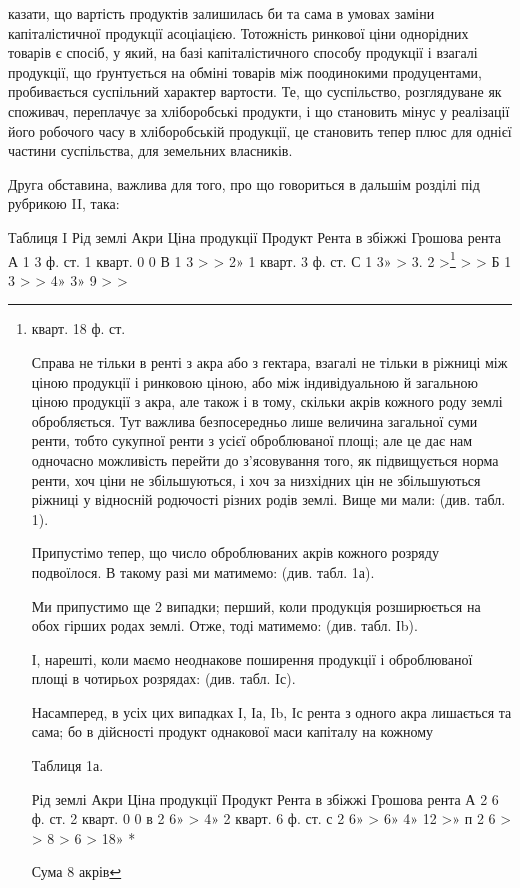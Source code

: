 \parcont{}  %
казати, що вартість продуктів залишилась би та сама в умовах заміни капіталістичної
продукції асоціацією. Тотожність ринкової ціни однорідних товарів є
спосіб, у який, на базі капіталістичного способу продукції і взагалі продукції,
що ґрунтується на обміні товарів між поодинокими продуцентами, пробивається
суспільний характер вартости. Те, що суспільство, розглядуване як споживач,
переплачує за хліборобські продукти, і що становить мінус у реалізації його
робочого часу в хліборобській продукції, це становить тепер плюс для однієї
частини суспільства, для земельних власників.

Друга обставина, важлива для того, про що говориться в дальшім розділі
під рубрикою II, така:

Таблиця I
Рід  землі    Акри    Ціна  продукції    Продукт    Рента в збіжжі    Грошова  рента
А    1    3 ф. ст.    1 кварт.    0    0
В    1    3 > >    2» 1 кварт.    3 ф. ст.
С 1 3» > 3. 2 >\footnote{
кварт. 18 ф. ст.

Справа не тільки в ренті з акра або з гектара, взагалі не тільки в ріжниці
між ціною продукції і ринковою ціною, або між індивідуальною й загальною
ціною продукції з
акра, але також і в тому,
скільки акрів кожного
роду землі обробляється.
Тут важлива безпосередньо
лише величина загальної
суми ренти, тобто сукупної
ренти з усієї оброблюваної
площі; але це дає
нам одночасно можливість
перейти до з’ясовування
того, як підвищується норма
ренти, хоч ціни не
збільшуються, і хоч за
низхідних цін не збільшуються
ріжниці у відносній
родючості різних
родів землі. Вище ми мали:
(див. табл. 1).

Припустімо тепер,
що число оброблюваних
акрів кожного розряду подвоїлося.
В такому разі ми
матимемо: (див. табл. 1а).

Ми припустимо ще
2 випадки; перший, коли
продукція розширюється
на обох гірших родах землі.
Отже, тоді матимемо:
(див. табл. Іb).

І, нарешті, коли маємо
неоднакове поширення
продукції і оброблюваної
площі в чотирьох розрядах:
(див. табл. Iс).

Насамперед, в усіх
цих випадках І, Іа, Іb, Іс
рента з одного акра лишається
та сама; бо в
дійсності продукт однакової
маси капіталу на кожному

Таблиця 1а.

Рід  землі    Акри    Ціна  продукції    Продукт    Рента в збіжжі    Грошова  рента
А    2    6 ф. ст.    2 кварт.    0    0
в    2    6» >    4» 2 кварт.    6 ф. ст.
с    2    6» >    6» 4» 12 >»
п    2    6 > >    8 >    6 >    18» *

Сума 8 акрів
} > >
Б 1 3 > > 4» 3» 9 > >

